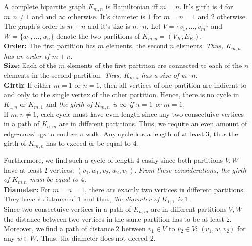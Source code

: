 \documentclass[a4paper]{article}
\begin{document}
\begin{solution}{9}
		\newpage		

		\begin{theorem}{A complete bipartite graph $K_{m, n}$ is Hamiltonian iff $m = n$. It's girth is $4$ for $m, n \neq 1$ and and $\infty$ otherwise. It's diameter is $1$ for $m = n = 1$ and $2$ otherwise. The graph's order is $m + n$ and it's size is $m \cdot n$.}
			Let $V = \{v_1, ..., v_m\}$ and $W = \{w_1, ..., w_n\}$ denote the two partitions of $K_{m, n} = (V_K, E_K)$.\\

			\textbf{Order:} The first partition has $m$ elements, the second $n$ elements. \emph{Thus, $K_{m,n}$ has an order of $m + n$.}\\

			\textbf{Size:} Each of the $m$ elements of the first partition are connected to each of the $n$ elements in the second partition. \emph{Thus, $K_{m,n}$ has a size of $m \cdot n$}.\\

			\textbf{Girth:} If either $m=1$ or $n=1$, then all vertices of one partition are indicent to and only to the single vertex of the other partition. Hence, there is no cycle in $K_{1, n}$ or $K_{m, 1}$ and \emph{the girth of $K_{m,n}$ is $\infty$ if $n = 1$ or $m=1$}.\\

				If $m, n \neq 1$, each cycle must have even length since any two consectuive vertices in a path of $K_{n,m}$ are in different partitions. Thus, we require an even amount of edge-crossings to enclose a walk. Any cycle has a length of at least $3$, thus the girth of $K_{m,n}$ has to exceed or be equal to $4$.

				Furthermore, we find such a cycle of length $4$ easily since both partitions $V, W$ have at least $2$ vertices: $(v_1, w_1, v_2, w_2, v_1)$. \emph{From these considerations, the girth of $K_{m,n}$ must be equal to $4$.}\\

			\textbf{Diameter:} For $m = n = 1$, there are exactly two vertices in different partitions. They have a distance of $1$ and thus, \emph{the diameter of $K_{1,1}$ is $1$}.\\

				Since two consectuive vertices in a path of $K_{n,m}$ are in different partitions $V, W$ the distance between two vertices in the same partition has to be at least $2$. Moreover, we find a path of distance $2$ between $v_1 \in V$ to $v_2 \in V$: $(v_1, w, v_2)$ for any $w \in W$. Thus, the diameter does not deceed $2$.


\end{theorem}
\end{solution}
\end{document}
